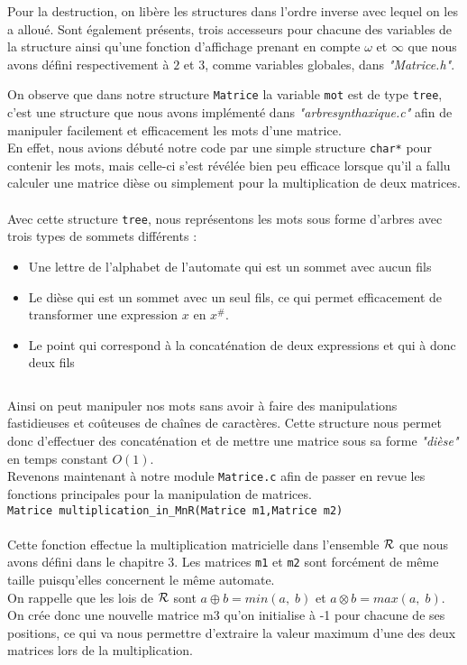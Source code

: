 \documentclass{report}
\begin{document}
Pour la destruction, on libère les structures dans l'ordre inverse avec lequel on les a alloué. Sont également présents, trois accesseurs pour chacune des variables de la structure ainsi qu'une fonction d'affichage prenant en compte $\omega$ et $\infty$ que nous avons défini respectivement à $2$ et $3$, comme variables globales, dans \textit{"Matrice.h"}.

On observe que dans notre structure \verb?Matrice? la variable \verb?mot? est de type \verb?tree?, c'est une structure que nous avons implémenté dans \textit{"arbresynthaxique.c"} afin de manipuler facilement et efficacement les mots d'une matrice.\\
En effet, nous avions débuté notre code par une simple structure \verb?char*? pour contenir les mots, mais celle-ci s'est révélée bien peu efficace lorsque qu'il a fallu calculer une matrice dièse ou simplement pour la multiplication de deux matrices. \\\\
Avec cette structure \verb?tree?, nous représentons les mots sous forme d'arbres avec trois types de sommets différents :
\begin{itemize}
\item Une lettre de l'alphabet de l'automate qui est un sommet avec aucun fils
\item Le dièse qui est un sommet avec un seul fils, ce qui permet efficacement de transformer une expression $x$ en $x^{\#}$.
\item Le point qui correspond à la concaténation de deux expressions et qui à donc deux fils
\end{itemize}
$\ $

Ainsi on peut manipuler nos mots sans avoir à faire des manipulations fastidieuses et coûteuses de chaînes de caractères. Cette structure nous permet donc d'effectuer des concaténation et de mettre une matrice sous sa forme \textit{"dièse"} en temps constant $O(1)$.\\

Revenons maintenant à notre module \verb?Matrice.c? afin de passer en revue les fonctions principales pour la manipulation de matrices. \\

\verb?Matrice multiplication_in_MnR(Matrice m1,Matrice m2)?\\\\
Cette fonction effectue la multiplication matricielle dans l'ensemble $\mathcal{R}$ que nous avons défini dans le chapitre 3. Les matrices \verb?m1? et \verb?m2? sont forcément de même taille puisqu'elles concernent le même automate.\\
On rappelle que les lois de $\mathcal{R}$ sont $a \oplus b = min(a,\;b)$ et $a \otimes b = max(a,\;b)$. On crée donc une nouvelle matrice m3 qu'on initialise à -1 pour chacune de ses positions, ce qui va nous permettre d'extraire la valeur maximum d'une des deux matrices lors de la multiplication.\\
\end{document}

